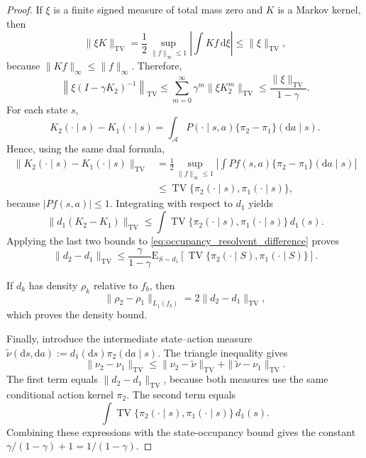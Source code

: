 \documentclass[12pt]{article}
\theoremstyle{remark}\newtheorem{remark}[theorem]{Remark}\theoremstyle{plain}
\newcommand{\E}{\mathrm{E}}
\begin{document}
\begin{proof}
    If $\xi$ is a finite signed measure of total mass zero and $K$
    is a Markov kernel, then
    \[
        \|\xi K\|_{\mathrm{TV}}
        =\frac12\sup_{\|f\|_\infty\leq1}
          \left|\int Kf\,\mathrm d\xi\right|
        \leq\|\xi\|_{\mathrm{TV}},
    \]
    because $\|Kf\|_\infty\leq\|f\|_\infty$.  Therefore,
    \[
        \left\|\xi(I-\gamma K_2)^{-1}\right\|_{\mathrm{TV}}
        \leq\sum_{m=0}^{\infty}\gamma^m
        \|\xi K_2^m\|_{\mathrm{TV}}
        \leq\frac{\|\xi\|_{\mathrm{TV}}}{1-\gamma}.
    \]
    For each state $s$,
    \[
        K_2(\cdot\mid s)-K_1(\cdot\mid s)
        =
        \int_{\mathcal A}
        P(\cdot\mid s,a)
        \{\pi_2-\pi_1\}(\mathrm da\mid s).
    \]
    Hence, using the same dual formula,
    \[
        \begin{aligned}
        \|K_2(\cdot\mid s)-K_1(\cdot\mid s)\|_{\mathrm{TV}}
        &=
        \frac12\sup_{\|f\|_\infty\leq1}
        \left|
        \int P f(s,a)\{\pi_2-\pi_1\}(\mathrm da\mid s)
        \right|\\
        &\leq
        \operatorname{TV}\{\pi_2(\cdot\mid s),
        \pi_1(\cdot\mid s)\},
        \end{aligned}
    \]
    because $|Pf(s,a)|\leq1$.  Integrating with respect to $d_1$
    yields
    \[
        \|d_1(K_2-K_1)\|_{\mathrm{TV}}
        \leq
        \int
        \operatorname{TV}\{\pi_2(\cdot\mid s),
        \pi_1(\cdot\mid s)\}\,d_1(s).
    \]
    Applying the last two bounds to
    \eqref{eq:occupancy_resolvent_difference} proves
    \[
        \|d_2-d_1\|_{\mathrm{TV}}
        \leq\frac{\gamma}{1-\gamma}
        \E_{S\sim d_1}\!\left[
        \operatorname{TV}\{\pi_2(\cdot\mid S),
        \pi_1(\cdot\mid S)\}\right].
    \]

    If $d_k$ has density $\rho_k$ relative to $f_b$, then
    \[
        \|\rho_2-\rho_1\|_{L_1(f_b)}
        =2\|d_2-d_1\|_{\mathrm{TV}},
    \]
    which proves the density bound.

    Finally, introduce the intermediate state--action measure
    $\widetilde\nu(\mathrm ds,\mathrm da)
      :=d_1(\mathrm ds)\pi_2(\mathrm da\mid s)$.  The triangle
    inequality gives
    \[
        \|\nu_2-\nu_1\|_{\mathrm{TV}}
        \leq\|\nu_2-\widetilde\nu\|_{\mathrm{TV}}
        +\|\widetilde\nu-\nu_1\|_{\mathrm{TV}}.
    \]
    The first term equals $\|d_2-d_1\|_{\mathrm{TV}}$, because both
    measures use the same conditional action kernel $\pi_2$.  The
    second term equals
    \[
        \int
        \operatorname{TV}\{\pi_2(\cdot\mid s),
        \pi_1(\cdot\mid s)\}\,d_1(s).
    \]
    Combining these expressions with the state-occupancy bound gives
    the constant
    $\gamma/(1-\gamma)+1=1/(1-\gamma)$.
\end{proof}
\end{document}
